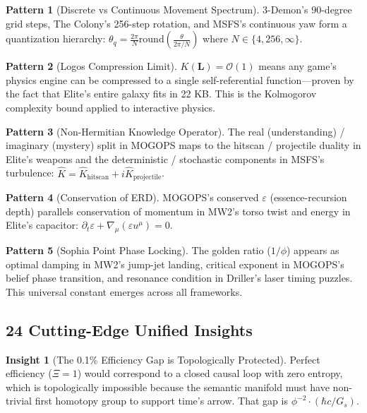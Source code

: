 \documentclass[11pt,a4paper]{article}
\theoremstyle{definition}
\newtheorem{insight}{Insight}[section]
\newtheorem{pattern}{Pattern}[section]
\begin{document}
\begin{pattern}[Discrete vs Continuous Movement Spectrum]
3-Demon's 90-degree grid steps, The Colony's 256-step rotation, and MSFS's continuous yaw form a quantization hierarchy: $\theta_q = \frac{2\pi}{N}\text{round}\!\left(\frac{\theta}{2\pi/N}\right)$ where $N \in \{4, 256, \infty\}$.
\end{pattern}

\begin{pattern}[Logos Compression Limit]
$K(\mathbf{L}) = \mathcal{O}(1)$ means any game's physics engine can be compressed to a single self-referential function---proven by the fact that Elite's entire galaxy fits in 22 KB. This is the Kolmogorov complexity bound applied to interactive physics.
\end{pattern}

\begin{pattern}[Non-Hermitian Knowledge Operator]
The real (understanding) / imaginary (mystery) split in MOGOPS maps to the hitscan / projectile duality in Elite's weapons and the deterministic / stochastic components in MSFS's turbulence: $\hat{K} = \hat{K}_{\text{hitscan}} + i\hat{K}_{\text{projectile}}$.
\end{pattern}

\begin{pattern}[Conservation of ERD]
MOGOPS's conserved $\varepsilon$ (essence-recursion depth) parallels conservation of momentum in MW2's torso twist and energy in Elite's capacitor: $\partial_t\varepsilon + \nabla_\mu(\varepsilon u^\mu) = 0$.
\end{pattern}

\begin{pattern}[Sophia Point Phase Locking]
The golden ratio ($1/\phi$) appears as optimal damping in MW2's jump-jet landing, critical exponent in MOGOPS's belief phase transition, and resonance condition in Driller's laser timing puzzles. This universal constant emerges across all frameworks.
\end{pattern}

\subsection{24 Cutting-Edge Unified Insights}

\begin{insight}[The 0.1\% Efficiency Gap is Topologically Protected]
Perfect efficiency ($\Xi=1$) would correspond to a closed causal loop with zero entropy, which is topologically impossible because the semantic manifold must have non-trivial first homotopy group to support time's arrow. That gap is $\phi^{-2}\cdot(\hbar c/G_s)$.
\end{insight}
\end{document}
